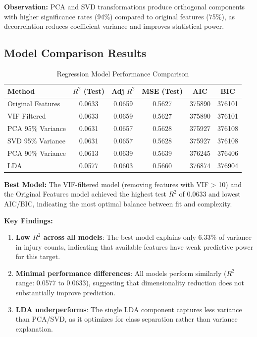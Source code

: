 \documentclass[stu,12pt,floatsintext]{apa7}
\begin{document}
\textbf{Observation:} PCA and SVD transformations produce orthogonal components with higher significance rates 
(94\%) compared to original features (75\%), as decorrelation reduces coefficient variance and improves statistical power.

\subsection{Model Comparison Results}

\begin{table}[H]
\centering
\caption{Regression Model Performance Comparison}
\begin{tabular}{lccccc}
\toprule
\textbf{Method} & \textbf{$R^2$ (Test)} & \textbf{Adj $R^2$} & \textbf{MSE (Test)} & \textbf{AIC} & \textbf{BIC} \\
\midrule
Original Features & 0.0633 & 0.0659 & 0.5627 & 375890 & 376101 \\
VIF Filtered & 0.0633 & 0.0659 & 0.5627 & 375890 & 376101 \\
PCA 95\% Variance & 0.0631 & 0.0657 & 0.5628 & 375927 & 376108 \\
SVD 95\% Variance & 0.0631 & 0.0657 & 0.5628 & 375927 & 376108 \\
PCA 90\% Variance & 0.0613 & 0.0639 & 0.5639 & 376245 & 376406 \\
LDA & 0.0577 & 0.0603 & 0.5660 & 376874 & 376904 \\
\bottomrule
\end{tabular}
\end{table}

\textbf{Best Model:} The VIF-filtered model (removing features with VIF > 10) and the Original Features model achieved 
the highest test $R^2$ of 0.0633 and lowest AIC/BIC, indicating the most optimal balance between fit and complexity.

\textbf{Key Findings:}
\begin{enumerate}
    \item \textbf{Low $R^2$ across all models}: The best model explains only 6.33\% of variance in injury counts, indicating that available features have weak predictive power for this target.
    \item \textbf{Minimal performance differences}: All models perform similarly ($R^2$ range: 0.0577 to 0.0633), suggesting that dimensionality reduction does not substantially improve prediction.
    \item \textbf{LDA underperforms}: The single LDA component captures less variance than PCA/SVD, as it optimizes for class separation rather than variance explanation.
\end{enumerate}
\end{document}

